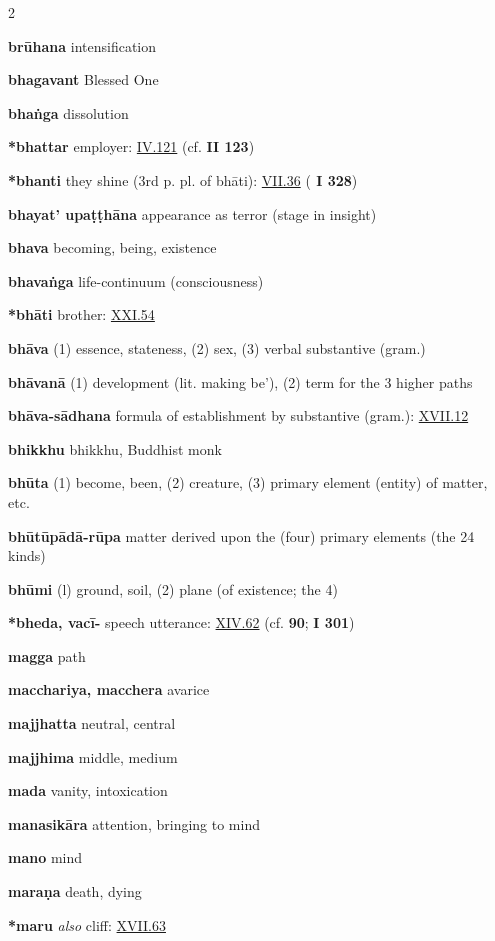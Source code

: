 \begin{multicols}{2}
\begin{vismHanging}
\par\textbf{brūhana} intensification
\par\textbf{bhagavant} Blessed One
\par\textbf{bhaṅga} dissolution
\par\textbf{*bhattar} employer: \hyperlink{IV.121}{IV.121}{} (cf. \textbf{\cite{M} II 123})
\par\textbf{*bhanti} they shine (3rd p. pl. of bhāti): \hyperlink{VII.36}{VII.36}{} (\textbf{\cite{M} I 328}) 
\par\textbf{bhayat’ upaṭṭhāna} appearance as terror (stage in insight) 
\par\textbf{bhava} becoming, being, existence
\par\textbf{bhavaṅga} life-continuum (consciousness) 
\par\textbf{*bhāti} brother: \hyperlink{XXI.54}{XXI.54}{}
\par\textbf{bhāva} (1) essence, stateness, (2) sex, (3) verbal substantive (gram.) 
\par\textbf{bhāvanā} (1) development (lit. making be’), (2) term for the 3 higher paths
\par\textbf{bhāva-sādhana} formula of establishment by substantive (gram.): \hyperlink{XVII.12}{XVII.12}{} 
\par\textbf{bhikkhu} bhikkhu, Buddhist monk
\par\textbf{bhūta} (1) become, been, (2) creature, (3) primary element (entity) of matter, etc.
\par\textbf{bhūtūpādā-rūpa} matter derived upon the (four) primary elements (the 24 kinds) 
\par\textbf{bhūmi} (l) ground, soil, (2) plane (of existence; the 4) 
\par\textbf{*bheda, vacī- } speech utterance: \hyperlink{XIV.62}{XIV.62}{} (cf. \textbf{\cite{Dhs-a} 90}; \textbf{\cite{M} I 301}) 
\par\textbf{magga} path
\par\textbf{macchariya, macchera} avarice
\par\textbf{majjhatta} neutral, central 
\par\textbf{majjhima} middle, medium
\par\textbf{mada} vanity, intoxication
\par\textbf{manasikāra} attention, bringing to mind
\par\textbf{mano} mind
\par\textbf{maraṇa} death, dying 
\par\textbf{*maru} \emph{also }cliff: \hyperlink{XVII.63}{XVII.63}{}

\end{vismHanging}
\end{multicols}
